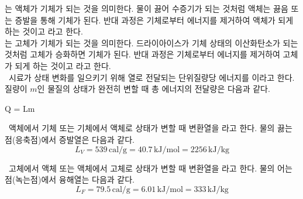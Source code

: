  는
액체가 기체가 되는 것을 의미한다.
물이 끓어 수증기가 되는 것처럼 액체는 끓음 또는 증발을 통해 기체가 된다.
반대 과정은 기체로부터 에너지를 제거하여 액체가 되게 하는 것이고
라고 한다. \\

%
 는 고체가 기체가 되는 것을 의미한다.
드라이아이스가 기체 상태의 이산화탄소가 되는 것처럼 고체가 승화하면 기체가 된다.
반대 과정은 기체로부터 에너지를 제거하여 고체가 되게 하는 것이고
라고 한다. \\

\ 시료가 상태 변화를 일으키기 위해 열로 전달되는 단위질량당 에너지를 이라고 한다.
질량이 $m$인 물질의 상태가 완전히 변할 때 총 에너지의 전달량은 다음과 같다.

\begin{eqbox} Q = Lm
\label{eq:heat_of_transformation} \end{eqbox}

\ 액체에서 기체 또는 기체에서 액체로 상태가 변할 때 변환열을 라고 한다.
물의 끓는점(응축점)에서 증발열은 다음과 같다. \\
%
\begin{equation} L_V = 539\,\mathrm{cal/g} = 40.7\,\mathrm{kJ/mol} = 2256\,\mathrm{kJ/kg} \end{equation}

\ 고체에서 액체 또는 액체에서 고체로 상태가 변할 때 변환열을 라고 한다.
물의 어는점(녹는점)에서 융해열는 다음과 같다.
\begin{equation} L_F = 79.5\,\mathrm{cal/g} = 6.01\,\mathrm{kJ/mol} = 333\,\mathrm{kJ/kg}
\label{eq:l_f_water} \end{equation}
\clearpage



